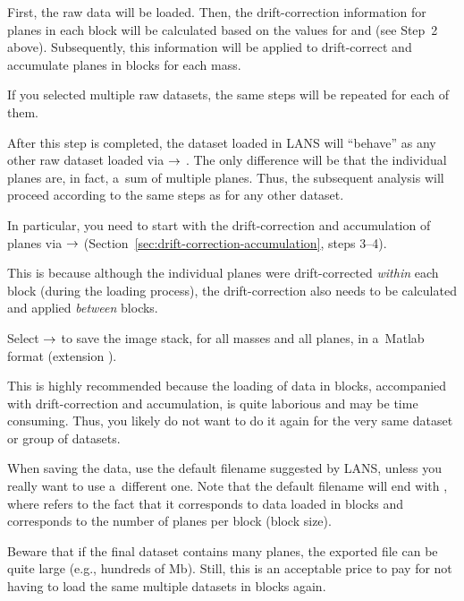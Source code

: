 \bul First, the raw data will be loaded. Then, the drift-correction information for planes in each block will be calculated based on the values for  and  (see Step~2 above). Subsequently, this information will be applied to drift-correct and accumulate planes in blocks for each mass.

\bul If you selected multiple raw datasets, the same steps will be repeated for each of them.

\bul After this step is completed, the dataset loaded in LANS will ``behave'' as any other raw dataset loaded via  $\rightarrow$ . The only difference will be that the individual planes are, in fact, a~sum of multiple planes. Thus, the subsequent analysis will proceed according to the same steps as for any other dataset. 

\s In particular, you need to start with the drift-correction and accumulation of planes via  $\rightarrow$  (Section~\ref{sec:drift-correction-accumulation}, steps 3--4). 

\bul This is because although the individual planes were drift-corrected \emph{within} each block (during the loading process), the drift-correction also needs to be calculated and applied \emph{between} blocks.

\s Select  $\rightarrow$  to save the image stack, for all masses and all planes, in a~Matlab format (extension ).

\bul This is highly recommended because the loading of data in blocks, accompanied with drift-correction and accumulation, is quite laborious and may be time consuming. Thus, you likely do not want to do it again for the very same dataset or group of datasets. 

\bul When saving the data, use the default filename suggested by LANS, unless you really want to use a~different one. Note that the default filename will end with , where  refers to the fact that it corresponds to data loaded in blocks and  corresponds to the number of planes per block (block size).

\bul Beware that if the final dataset contains many planes, the exported  file can be quite large (e.g., hundreds of Mb). Still, this is an acceptable price to pay for not having to load the same multiple datasets in blocks again.


